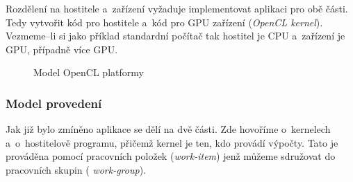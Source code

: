  Rozdělení na hostitele a~zařízení vyžaduje implementovat aplikaci pro obě části. Tedy
vytvořit kód pro hostitele a~kód pro GPU zařízení ({\it OpenCL kernel}). Vezmeme--li si jako
příklad standardní počítač tak hostitel je CPU a~zařízení je GPU, případně více GPU.
\begin{figure}[ht]
    \begin{center}
    \end{center}
    \caption{Model OpenCL platformy \cite{Khronos:2015}}
    \label{platform}
\end{figure}
\subsubsection{Model provedení}
Jak již bylo zmíněno aplikace se dělí na dvě části. Zde hovoříme o~kernelech a~o~hostitelově
programu, přičemž kernel je ten, kdo provádí výpočty. Tato  je prováděna pomocí
pracovních položek ({\it work-item}) jenž můžeme sdružovat do pracovních skupin ({\it
work-group}).

